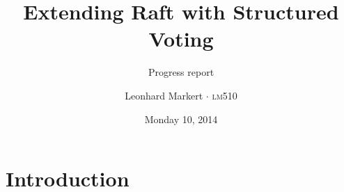 \documentclass{beamer}
\title{Extending Raft with Structured Voting}
\subtitle{Progress report}
\author{Leonhard Markert \(\cdot\) \textsc{lm510}}
\date{Monday 10, 2014}
\begin{document}

\begin{frame}
    \titlepage
\end{frame}



\section{Introduction}



\end{document}
